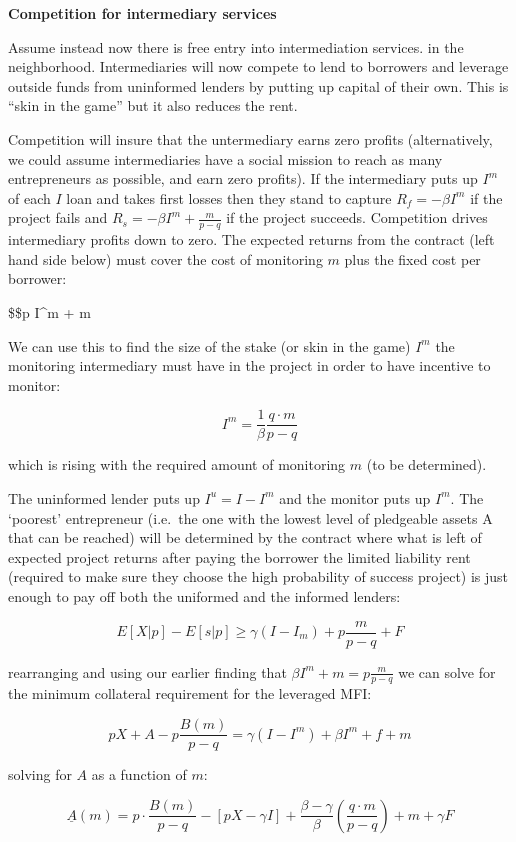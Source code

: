 \documentclass[11pt]{article}
\begin{document}
    \textbf{Competition for intermediary services}

Assume instead now there is free entry into intermediation services. in
the neighborhood. Intermediaries will now compete to lend to borrowers
and leverage outside funds from uninformed lenders by putting up capital
of their own. This is ``skin in the game'' but it also reduces the rent.

Competition will insure that the untermediary earns zero profits
(alternatively, we could assume intermediaries have a social mission to
reach as many entrepreneurs as possible, and earn zero profits). If the
intermediary puts up \(I^m\) of each \(I\) loan and takes first losses
then they stand to capture \(R_f = -\beta I^m\) if the project fails and
\(R_s = -\beta I^m + \frac{m}{p-q}\) if the project succeeds.
Competition drives intermediary profits down to zero. The expected
returns from the contract (left hand side below) must cover the cost of
monitoring \(m\) plus the fixed cost per borrower:

\$\$p \cdot {} \ge \beta I\^{}m + m

    We can use this to find the size of the stake (or skin in the game)
\(I^m\) the monitoring intermediary must have in the project in order to
have incentive to monitor:

\[
I^m = \frac{1}{\beta}\frac{q \cdot m}{p-q} 
\]

    which is rising with the required amount of monitoring \(m\) (to be
determined).

The uninformed lender puts up \(I^u = I - I^m\) and the monitor puts up
\(I^m\). The `poorest' entrepreneur (i.e.~the one with the lowest level
of pledgeable assets A that can be reached) will be determined by the
contract where what is left of expected project returns after paying the
borrower the limited liability rent (required to make sure they choose
the high probability of success project) is just enough to pay off both
the uniformed and the informed lenders:

\[
E[X|p] - E[s|p] \ge \gamma (I - I_m) + p \frac{m}{p-q} + F
\]

rearranging and using our earlier finding that
\(\beta I^m + m = p \frac{m}{p-q}\) we can solve for the minimum
collateral requirement for the leveraged MFI:

\[
pX + A - p\frac{B(m)}{p-q} = \gamma (I - I^m) + \beta I^m +  f + m
\]

solving for \(A\) as a function of \(m\):

    \[
\underline A (m) = p \cdot \frac{B(m)}{p-q} 
- \left[ {pX - \gamma I} \right] 
+ \frac{\beta - \gamma}{\beta} \left( \frac{q \cdot m}{p-q} \right ) + m + \gamma F
\]
\end{document}
